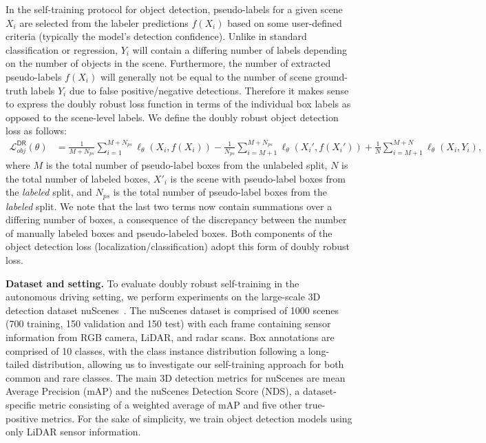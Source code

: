 In the self-training protocol for object detection, %
pseudo-labels for a given scene $X_i$ are selected from the labeler predictions $f(X_i)$ based on some user-defined criteria (typically the model's detection confidence). 
Unlike in standard classification or regression, $Y_i$ will contain a differing number of labels depending on the number of objects in the scene. Furthermore, the number of extracted pseudo-labels $f(X_i)$ will generally not be equal to the number of scene ground-truth labels $Y_i$ due to false positive/negative detections. Therefore it makes sense to express the doubly robust loss function in terms of the individual box labels as opposed to the scene-level labels. We define the doubly robust object detection loss as follows:
\begin{align*}
\mathcal{L}^{\mathsf{DR}}_{obj}(\theta) 
& = \frac{1}{M+N_{ps}}  \sum_{i=1}^{M+N_{ps}} \ell_\theta(X_i,  f(X_i)) -  \frac{1}{N_{ps}} \sum_{i=M+1}^{M+N_{ps}} \ell_\theta(X_i',  f(X_i'))  + \frac{1}{N} \sum_{i=M+1}^{M+N} \ell_\theta(X_i, Y_i),
\end{align*}
where $M$ is the total number of pseudo-label boxes from the unlabeled split, $N$ is the total number of labeled boxes, $X'_i$ is the scene with pseudo-label boxes from the \textit{labeled} split, and $N_{ps}$ is the total number of pseudo-label boxes from the \textit{labeled} split. We note that the last two terms now contain summations over a differing number of boxes, a consequence of the discrepancy between the number of manually labeled boxes and pseudo-labeled boxes. Both components of the object detection loss (localization/classification) adopt this form of  doubly robust loss.

\textbf{Dataset and setting.} 
To evaluate doubly robust self-training in the autonomous driving setting, we perform experiments on the large-scale 3D detection dataset nuScenes~\citep{nuscenes2019}. The nuScenes dataset is comprised of 1000 scenes (700 training, 150 validation and 150 test) with each frame containing sensor information from RGB camera, LiDAR, and radar scans. Box annotations are comprised of 10 classes, with the class instance distribution following a long-tailed distribution, allowing us to investigate our self-training approach for both common and rare classes. The main 3D detection metrics for nuScenes are mean Average Precision (mAP) and the nuScenes Detection Score (NDS), a dataset-specific metric consisting of a weighted average of mAP and five other true-positive metrics. For the sake of simplicity, we train object detection models using only LiDAR sensor information.


